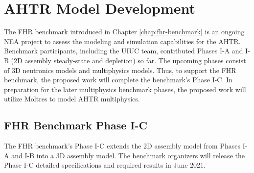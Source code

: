\section{AHTR Model Development}
The \gls{FHR} benchmark introduced in Chapter \ref{chap:fhr-benchmark} is an 
ongoing \gls{NEA} project to assess the modeling and simulation capabilities 
for the \gls{AHTR}. 
Benchmark participants, including the \gls{UIUC} team, contributed Phases I-A 
and I-B (2D assembly steady-state and depletion) so far.  
The upcoming phases consist of 3D neutronics models and multiphysics models. 
Thus, to support the \gls{FHR} benchmark, the proposed work will complete the 
benchmark's Phase I-C.
In preparation for the later multiphysics benchmark phases, the proposed 
work will utilize Moltres to model \gls{AHTR} multiphysics.

\subsection{FHR Benchmark Phase I-C}
The \gls{FHR} benchmark's Phase I-C extends the 2D assembly model from Phases 
I-A and I-B into a 3D assembly model. 
The benchmark organizers will release the Phase I-C detailed specifications and 
required results in June 2021.

